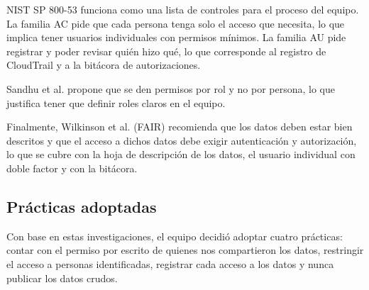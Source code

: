 NIST SP 800-53 funciona como una lista de controles para el proceso del equipo. La familia AC pide que cada persona tenga solo el acceso que necesita, lo que implica tener usuarios individuales con permisos mínimos. La familia AU pide registrar y poder revisar quién hizo qué, lo que corresponde al registro de CloudTrail y a la bitácora de autorizaciones.

Sandhu et al. propone que se den permisos por rol y no por persona, lo que justifica tener que definir roles claros en el equipo.

Finalmente, Wilkinson et al. (FAIR) recomienda que los datos deben estar bien descritos y que el acceso a dichos datos debe exigir autenticación y autorización, lo que se cubre con la hoja de descripción de los datos, el usuario individual con doble factor y con la bitácora.

\subsection{Prácticas adoptadas}

Con base en estas investigaciones, el equipo decidió adoptar cuatro prácticas: contar con el permiso por escrito de quienes nos compartieron los datos, restringir el acceso a personas identificadas, registrar cada acceso a los datos y nunca publicar los datos crudos.
